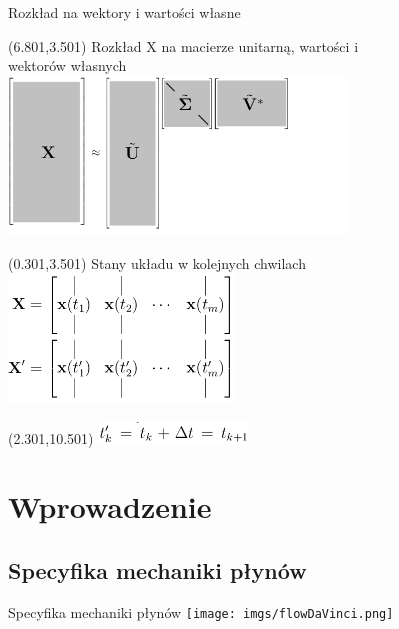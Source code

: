\documentclass[aspectratio=169]{beamer}
\begin{document}
\begin{frame} {Rozkład na wektory i wartości własne}
\begin{textblock}{13}(6.801,3.501)
Rozkład X na macierze unitarną, wartości i \\ wektorów własnych \\
\includegraphics[width=9cm]{imgs/a_truncated_svd.png}
\end{textblock}
\begin{textblock}{13}(0.301,3.501)
Stany układu w kolejnych chwilach \\
\includegraphics[width=6cm]{imgs/a_X_svd.png}
\end{textblock}
\begin{textblock}{13}(2.301,10.501)
\includegraphics[width=4cm]{imgs/a_t_svd.png}
\end{textblock}
\end{frame}


\section{Wprowadzenie}
\subsection{Specyfika mechaniki płynów}
\begin{frame}{Specyfika mechaniki płynów}
\texttt{[image: imgs/flowDaVinci.png]}
\end{frame}
\end{document}
